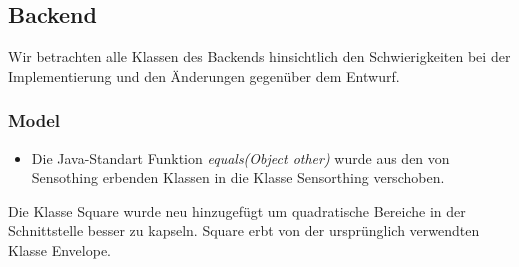 \subsection{Backend}
Wir betrachten alle Klassen des Backends hinsichtlich den Schwierigkeiten bei der Implementierung und den Änderungen gegenüber dem Entwurf.

\subsubsection{Model}
\noChange
{}
\noChange
{}
\noChange
{}
\noChange
{}
\changedFunctions
\begin{itemize}[noitemsep]
    \item Die Java-Standart Funktion \textit{equals(Object other)} wurde aus den von Sensothing erbenden Klassen in die Klasse Sensorthing verschoben.
\end{itemize}
\noChange
{}
\noChange
{}
\noChange
{}
\noChange
{}
Die Klasse Square wurde neu hinzugefügt um quadratische Bereiche in der Schnittstelle besser zu kapseln. Square erbt von der ursprünglich verwendten Klasse Envelope.

